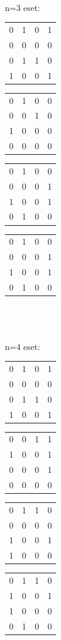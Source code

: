 \documentclass[paper=a4, fontsize=11pt]{article}
\begin{document}
\\
\\
\\
n=3 eset:
\begin{tabular}{cccc}
0&1&0&1\\
0&0&0&0\\
0&1&1&0\\
1&0&0&1
\end{tabular}
\quad
\begin{tabular}{cccc}
0&1&0&0\\
0&0&1&0\\
1&0&0&0\\
0&0&0&0
\end{tabular}
\quad
\begin{tabular}{cccc}
0&1&0&0\\
0&0&0&1\\
1&0&0&1\\
0&1&0&0
\end{tabular}
\quad
\begin{tabular}{cccc}
0&1&0&0\\
0&0&0&1\\
1&0&0&1\\
0&1&0&0
\end{tabular}
\\
\\
\\
n=4 eset:
\begin{tabular}{cccc}
0&1&0&1\\
0&0&0&0\\
0&1&1&0\\
1&0&0&1
\end{tabular}
\quad
\begin{tabular}{cccc}
0&0&1&1\\
1&0&0&1\\
0&0&0&1\\
0&0&0&0
\end{tabular}
\quad
\begin{tabular}{cccc}
0&1&1&0\\
0&0&0&0\\
1&0&0&1\\
1&0&0&0
\end{tabular}
\quad
\begin{tabular}{cccc}
0&1&1&0\\
1&0&0&1\\
1&0&0&0\\
0&1&0&0
\end{tabular}
\\
\\
\\
\end{document}
